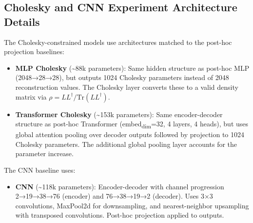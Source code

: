 \documentclass[11pt]{article}
\begin{document}
\subsection{Cholesky and CNN Experiment Architecture Details}
\label{sec:orgb592d71}

The Cholesky-constrained models use architectures matched to the post-hoc projection baselines:
\begin{itemize}
\item \textbf{MLP Cholesky} (\textasciitilde{}88k parameters): Same hidden structure as post-hoc MLP (2048→28→28), but outputs 1024 Cholesky parameters instead of 2048 reconstruction values. The Cholesky layer converts these to a valid density matrix via \(\rho = LL^\dagger / \text{Tr}(LL^\dagger)\).
\item \textbf{Transformer Cholesky} (\textasciitilde{}153k parameters): Same encoder-decoder structure as post-hoc Transformer (embed\textsubscript{dim}=32, 4 layers, 4 heads), but uses global attention pooling over decoder outputs followed by projection to 1024 Cholesky parameters. The additional global pooling layer accounts for the parameter increase.
\end{itemize}

The CNN baseline uses:
\begin{itemize}
\item \textbf{CNN} (\textasciitilde{}118k parameters): Encoder-decoder with channel progression 2→19→38→76 (encoder) and 76→38→19→2 (decoder). Uses 3×3 convolutions, MaxPool2d for downsampling, and nearest-neighbor upsampling with transposed convolutions. Post-hoc projection applied to outputs.
\end{itemize}
\end{document}
